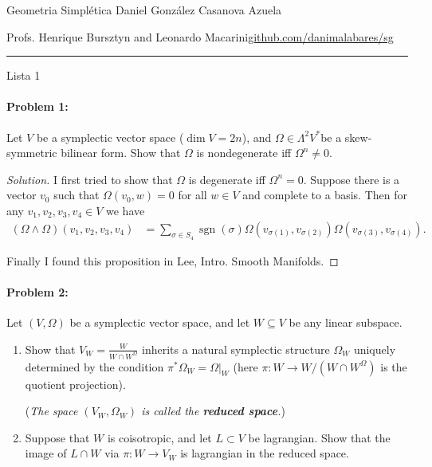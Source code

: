 




\begin{minipage}{\textwidth}
	\begin{minipage}{1\textwidth}
		Geometria Simpl\'etica \hfill Daniel González Casanova Azuela
		
		{\small Profs. Henrique Bursztyn and Leonardo Macarini\hfill\href{https://github.com/danimalabares/sg}{github.com/danimalabares/sg}}
	\end{minipage}
\end{minipage}\vspace{.2cm}\hrule

\vspace{10pt}
{\huge Lista 1}


\paragraph{Problem 1:} Let $V$ be a symplectic vector space ($\dim V=2n$), and $\Omega\in \Lambda^{2} V^{*}$be a skew-symmetric bilinear form. Show that $\Omega$ is nondegenerate iff $\Omega^{n} \neq 0$.

\begin{proof}[Solution]
	I first tried to show that $\Omega$ is degenerate iff $\Omega^{n}=0$. Suppose there is a vector $v_0$ such that $\Omega( v_0,w)=0$ for all $w\in V$ and complete to a basis. Then for any $v_1,v_2,v_3,v_4\in V$ we have
	 \begin{align*}
		 (\Omega\wedge \Omega)(v_1,v_2,v_3,v_4)&=\sum_{\sigma\in S_{4}}\operatorname{s gn}(\sigma)\Omega(v_{\sigma(1)},v_{\sigma(2)})\Omega(v_{\sigma(3)},v_{\sigma(4)}).
		 \end{align*}

		 Finally I found this proposition in Lee, Intro. Smooth Manifolds.
\end{proof}

\paragraph{Problem 2:} Let $(V,\Omega)$ be a symplectic vector space, and let $W\subseteq V$ be any linear subspace.
\begin{enumerate}[label=\alph*.]
	\item Show that $V_{W}=\frac{W}{W\cap W^{\Omega}}$ inherits a natural symplectic structure $\Omega_{W}$ uniquely determined by the condition $\pi^{*} \Omega_{W}=\Omega|_{W}$ (here $\pi:W\to W/(W\cap W^{\Omega}) $ is the quotient projection).
	
		(\textit{The space $(V_{W},\Omega_{W})$ is called the \textbf{reduced space}.})

	\item Suppose that $W$ is coisotropic, and let $L\subset V$ be lagrangian. Show that the image of $L\cap W$ via $\pi:W\to V_{W}$ is lagrangian in the reduced space.
\end{enumerate}

